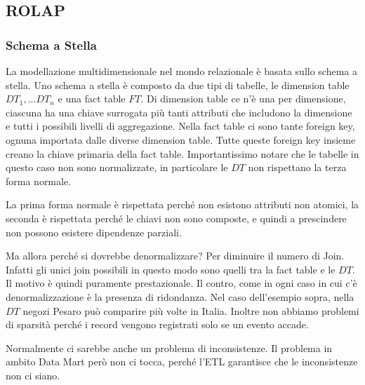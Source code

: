 \subsection{ROLAP}
\subsubsection{Schema a Stella}
La modellazione multidimensionale nel mondo relazionale è basata sullo schema a stella.
Uno schema a stella è composto da due tipi di tabelle, le dimension table $DT_1, ... DT_n$ e una fact table $FT$.
Di dimension table ce n'è una per dimensione, ciascuna ha una chiave surrogata più tanti attributi che includono la dimensione e tutti i possibili livelli di aggregazione.\newline
Nella fact table ci sono tante foreign key, ognuna importata dalle diverse dimension table. Tutte queste foreign key insieme creano la chiave primaria della fact table.
\noindent Importantissimo notare che le tabelle in questo caso non sono normalizzate, in particolare le $DT$ non rispettano la terza forma normale.
\begin{info}
	La prima forma normale è rispettata perché non esistono attributi non atomici, la seconda è rispettata perché le chiavi non sono composte, e quindi a prescindere non possono esistere dipendenze parziali.
\end{info}
Ma allora perché si dovrebbe denormalizzare? Per diminuire il numero di Join. Infatti gli unici join possibili in questo modo sono quelli tra la fact table e le $DT$. Il motivo è quindi puramente prestazionale. Il contro, come in ogni caso in cui c'è denormalizzazione è la presenza di ridondanza. Nel caso dell'esempio sopra, nella $DT$ negozi Pesaro può comparire più volte in Italia.
Inoltre non abbiamo problemi di sparsità perché i record vengono registrati solo se un evento accade.
\begin{warn}
	Normalmente ci sarebbe anche un problema di inconsistenze. Il problema in ambito Data Mart però non ci tocca, perché l'ETL garantisce che le inconsistenze non ci siano.
\end{warn}
